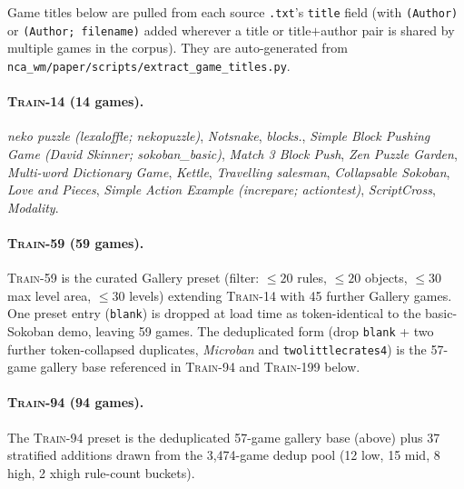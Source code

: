 Game titles below are pulled from each source \texttt{.txt}'s
\texttt{title} field (with \texttt{(Author)} or
\texttt{(Author; filename)} added wherever a title or
title$+$author pair is shared by multiple games in the corpus). They
are auto-generated from
\texttt{nca\_wm/paper/scripts/extract\_game\_titles.py}.

\paragraph{\textsc{Train-14} (14 games).}
\textit{neko puzzle (lexaloffle; nekopuzzle)}, \textit{Notsnake},
\textit{blocks.}, \textit{Simple Block Pushing Game (David Skinner;
sokoban\_basic)}, \textit{Match 3 Block Push}, \textit{Zen Puzzle
Garden}, \textit{Multi-word Dictionary Game}, \textit{Kettle},
\textit{Travelling salesman}, \textit{Collapsable Sokoban},
\textit{Love and Pieces}, \textit{Simple Action Example (increpare;
actiontest)}, \textit{ScriptCross}, \textit{Modality}.

\paragraph{\textsc{Train-59} (59 games).}
\textsc{Train-59} is the curated Gallery preset (filter: $\le 20$
rules, $\le 20$ objects, $\le 30$ max level area, $\le 30$ levels)
extending \textsc{Train-14} with 45 further Gallery games. One
preset entry (\texttt{blank}) is dropped at load time as
token-identical to the basic-Sokoban demo, leaving 59 games. The
deduplicated form (drop \texttt{blank} + two further token-collapsed
duplicates, \textit{Microban} and \texttt{twolittlecrates4}) is the
57-game gallery base referenced in \textsc{Train-94} and
\textsc{Train-199} below.

\paragraph{\textsc{Train-94} (94 games).}
The \textsc{Train-94} preset is the deduplicated 57-game gallery
base (above) plus 37 stratified additions drawn from the
3{,}474-game dedup pool (12 low, 15 mid, 8 high, 2 xhigh rule-count
buckets).

